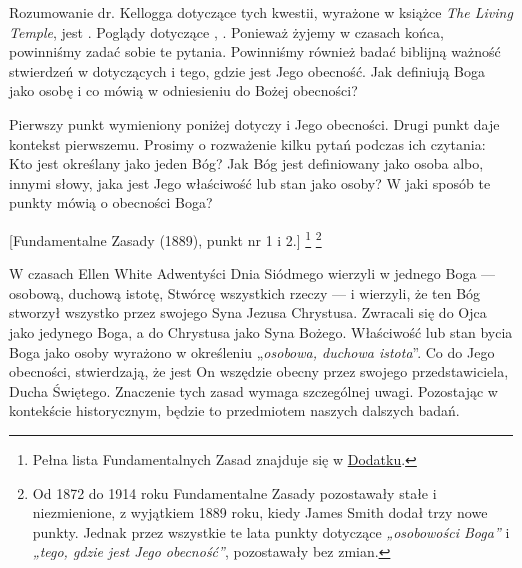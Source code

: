Rozumowanie dr. Kellogga dotyczące tych kwestii, wyrażone w książce \textit{The Living Temple}, jest . Poglądy dotyczące , . Ponieważ żyjemy w czasach końca, powinniśmy zadać sobie te pytania. Powinniśmy również badać biblijną ważność stwierdzeń w  dotyczących  i tego, gdzie jest Jego obecność. Jak  definiują Boga jako osobę i co mówią w odniesieniu do Bożej obecności?

Pierwszy punkt wymieniony poniżej dotyczy  i Jego obecności. Drugi punkt daje kontekst pierwszemu. Prosimy o rozważenie kilku pytań podczas ich czytania: Kto jest określany jako jeden Bóg? Jak Bóg jest definiowany jako osoba albo, innymi słowy, jaka jest Jego właściwość lub stan jako osoby? W jaki sposób te punkty mówią o obecności Boga?


[Fundamentalne Zasady (1889), punkt nr 1 i 2.] \footnote{Pełna lista Fundamentalnych Zasad znajduje się w \hyperref[chap:appendix]{Dodatku}.} \footnote{Od 1872 do 1914 roku Fundamentalne Zasady pozostawały stałe i niezmienione, z wyjątkiem 1889 roku, kiedy James Smith dodał trzy nowe punkty. Jednak przez wszystkie te lata punkty dotyczące \textit{„osobowości Boga”} i \textit{„tego, gdzie jest Jego obecność”}, pozostawały bez zmian.}

W czasach Ellen White Adwentyści Dnia Siódmego wierzyli w jednego Boga — osobową, duchową istotę, Stwórcę wszystkich rzeczy — i wierzyli, że ten Bóg stworzył wszystko przez swojego Syna Jezusa Chrystusa. Zwracali się do Ojca jako jedynego Boga, a do Chrystusa jako Syna Bożego. Właściwość lub stan bycia Boga jako osoby wyrażono w określeniu „\textit{osobowa, duchowa istota}”. Co do Jego obecności,  stwierdzają, że jest On wszędzie obecny przez swojego przedstawiciela, Ducha Świętego. Znaczenie tych zasad wymaga szczególnej uwagi. Pozostając w kontekście historycznym, będzie to przedmiotem naszych dalszych badań.

